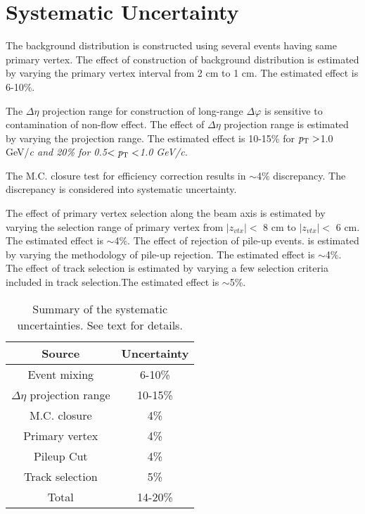\section{Systematic Uncertainty}
The background distribution is constructed using several events having same primary vertex. The effect of construction of background distribution is estimated by varying the primary vertex interval from 2 cm to 1 cm. The estimated effect is 6-10\%.

The $\Delta\eta$ projection range for construction of long-range $\Delta\varphi$ is sensitive to contamination of non-flow effect. The effect of  $\Delta\eta$ projection range is estimated by varying the projection range. The estimated effect is 10-15\% for $\it{p}_{\rm{T}}>$1.0 GeV/\it{c}\rm{} and 20\% for 0.5$<\it{p}_{\rm{T}}<$1.0 GeV/\it{c}\rm{}. 

The M.C. closure test for efficiency correction results in $\sim$4\% discrepancy. The discrepancy is considered into systematic uncertainty.

The effect of primary vertex selection along the beam axis is estimated by varying the selection range of primary vertex from $|z_{vtx}|<$ 8 cm to $|z_{vtx}|<$ 6 cm. The estimated effect is $\sim$4\%. The effect of rejection of pile-up events. is estimated by varying the methodology of pile-up rejection. The estimated effect is $\sim$4\%. The effect of track selection is estimated by varying a few selection criteria included in track selection.The estimated effect is $\sim$5\%. 


\begin{table}[!h]
\centering
\caption{ Summary of the systematic uncertainties. See text for details.}
\begin{tabular}{ c|c }
\hline
Source &  Uncertainty \\ \hline
Event mixing & 6-10\% \\  \hline
$\Delta\eta$ projection range & 10-15\% \\ \hline
M.C. closure & 4\% \\ \hline
Primary vertex & 4\% \\ \hline
Pileup Cut & 4\% \\ \hline
Track selection & 5\% \\ \hline
Total & 14-20\% \\
\hline
\end{tabular}
\end{table}



